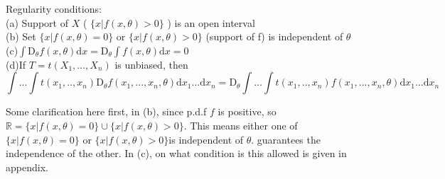\documentclass[a4paper,12pt]{article}
\begin{document}
Regularity conditions:\\
(a) Support of $X$ ( $\{ x | f(x, \theta) > 0 \}$ ) is an open interval\\
(b) Set $\{ x | f(x, \theta) = 0 \}$ or $\{ x | f(x, \theta) > 0 \}$ (support of f) is independent of $\theta$\\
(c)$\int \mathrm{D}_\theta f(x, \theta) \mathrm{d}x = \mathrm{D}_\theta \int f(x, \theta) \mathrm{d}x = 0$\\
(d)If $T = t(X_1, ..., X_n)$ is unbiased, then
$$\int ... \int t(x_1, .., x_n) \mathrm{D}_\theta f(x_1, ..., x_n, \theta) \mathrm{d}x_1...\mathrm{d}x_n = \mathrm{D}_\theta  \int ... \int t(x_1, .., x_n) f(x_1, ..., x_n, \theta) \mathrm{d}x_1...\mathrm{d}x_n $$ 

Some clarification here first, in (b), since p.d.f $f$ is positive, so $ \mathbb{R} = \{ x | f(x, \theta) = 0 \} \cup \{ x | f(x, \theta) > 0 \}$. This means either one of $\{ x | f(x, \theta) = 0 \}$ or $\{ x | f(x, \theta) > 0 \}$is independent of $\theta$.
 guarantees the independence of the other. In (c), on what condition is this allowed is given in appendix. \\
 
\end{document}
